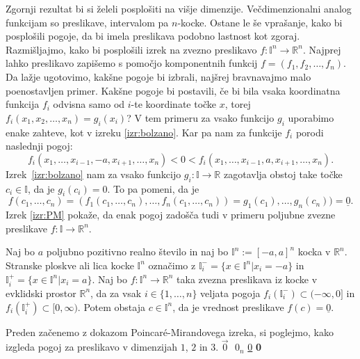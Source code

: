 \documentclass[mat1]{fmfdelo}
\newcommand{\R}{\mathbb R}
\newcommand{\I}{\mathbb I}
\newcommand{\0}{\underline{0}}
\begin{document}
Zgornji rezultat bi si želeli posplošiti na višje dimenzije. Večdimenzionalni analog funkcijam so preslikave, intervalom pa $n$-kocke. Ostane le še vprašanje, kako bi posplošili pogoje, da bi imela preslikava podobno lastnost kot zgoraj. Razmišljajmo, kako bi posplošili izrek na zvezno preslikavo $f : \I^n \to \R^n$. Najprej lahko preslikavo zapišemo s pomočjo komponentnih funkcij $f = (f_1, f_2, \dots, f_n)$. Da lažje ugotovimo, kakšne pogoje bi izbrali, najšrej bravnavajmo malo poenostavljen primer. Kakšne pogoje bi postavili, če bi bila vsaka koordinatna funkcija $f_i$ odvisna samo od $i$-te koordinate točke $x$, torej $f_i(x_1, x_2, \dots, x_n) = g_i(x_i)$? V tem primeru za vsako funkcijo $g_i$ uporabimo enake zahteve, kot v izreku \ref{izr:bolzano}. Kar pa nam za funkcije $f_i$ porodi naslednji pogoj: 
$$f_i(x_1, \dots, x_{i-1}, -a, x_{i+1}, \dots, x_n) < 0 < f_i(x_1, \dots, x_{i-1}, a, x_{i+1}, \dots, x_n).$$
Izrek~\ref{izr:bolzano} nam za vsako funkcijo $g_i : \I \to \R$ zagotavlja obstoj take točke $c_i \in \I$, da je $g_i(c_i) = 0$. To pa pomeni, da je $$f(c_1, \dots, c_n) = (f_1(c_1, \dots, c_n), \dots, f_n(c_1, \dots, c_n)) = g_1(c_1), \dots, g_n(c_n)) = \0.$$
Izrek \ref{izr:PM} pokaže, da enak pogoj zadošča tudi v primeru poljubne zvezne preslikave $f : \I \to \R^n$.


\begin{izrek}\label{izr:PM}
Naj bo $a$ poljubno pozitivno realno število in naj bo $\I^n := [-a, a]^n$ kocka v $\R^n$. Stranske ploskve ali lica kocke $\I^n$ označimo z $\I_i^- = \{x\in \I^n | x_i = -a\}$ in $\I_i^+ = \{x\in \I^n | x_i = a\}.$
 Naj bo $f : \I^n  \to \R^n$ taka zvezna preslikava iz kocke v evklidski prostor $\R^n$, da za vsak $i \in \{1, \dots, n\}$ veljata pogoja $f_i(\I_i^-) \subset (- \infty, 0] $ in  $f_i(\I_i^+) \subset [0, \infty) $. Potem obstaja $c \in \I^n$, da je vrednost preslikave $f(c) = \0$.
\end{izrek}
Preden začenemo z dokazom Poincar\'e-Mirandovega izreka, si poglejmo, kako izgleda pogoj za preslikavo v dimenzijah $1$, $2$ in $3$.
$\vec{0} \textbf{ } 0_n$ \underline{0} \textbf{0}
\end{document}

